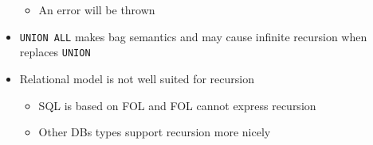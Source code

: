 \begin{itemize}
\begin{itemize}
            \item An error will be thrown
        \end{itemize}
    \item \verb+UNION ALL+ makes bag semantics and may cause infinite recursion when replaces \verb+UNION+
    \item Relational model is not well suited for recursion
        \begin{itemize}
            \item SQL is based on FOL and FOL cannot express recursion
            \item Other DBs types support recursion more nicely
        \end{itemize}
\end{itemize}
